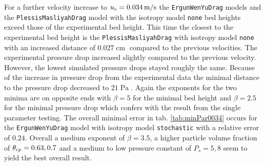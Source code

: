 For a further velocity increase to $u_c = 0.034 \operatorname{m/s}$ the \lstinline|ErgunWenYuDrag| models and the \lstinline|Plessis|\-\lstinline|MasliyahDrag| model with the isotropy model \lstinline|none| bed heights exceed those of the experimental bed height. This time the closest to the experimental bed height is the \lstinline|PlessisMasliyahDrag| with isotropy model \lstinline|none| with an increased distance of $0.027 \operatorname{cm}$ compared to the previous velocities.
The experimental pressure drop increased slightly compared to the previous velocity.
However, the lowest simulated pressure drops stayed roughly the same. Because of the increase in pressure drop from the experimental data the minimal distance to the pressure drop decreased to $21\operatorname{Pa}$.
Again the exponents for the two minima are on opposite ends with $\beta = 5$ for the minimal bed height and $\beta = 2.5$ for the minimal pressure drop which confers with the result from the single parameter testing.
The overall minimal error in tab. \ref{tab:minPar0034} occurs for the \lstinline|ErgunWenYuDrag| model with isotropy model \lstinline|stochastic| with a relative error of $0.24$. Overall a medium exponent of $\beta = 3.5$, a higher particle volume fraction of $\theta_{cp} = 0.63, 0.7$ and a medium to low pressure constant of $P_s= 5, 8$ seem to yield the best overall result.



